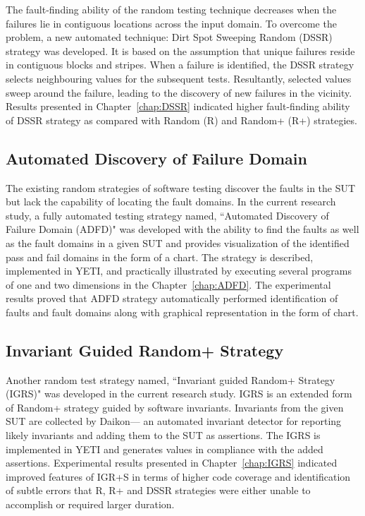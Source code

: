 The fault-finding ability of the random testing technique decreases when the failures lie in contiguous locations across the input domain. To overcome the problem, a new automated technique: Dirt Spot Sweeping Random (DSSR) strategy was developed. It is based on the assumption that unique failures reside in contiguous blocks and stripes. When a failure is identified, the DSSR strategy selects neighbouring values for the subsequent tests. Resultantly, selected values sweep around the failure, leading to the discovery of new failures in the vicinity. Results presented in Chapter~\ref{chap:DSSR} indicated higher fault-finding ability of DSSR strategy as compared with Random (R) and Random+ (R+) strategies.

\subsection{Automated Discovery of Failure Domain}
The existing random strategies of software testing discover the faults in the SUT but lack the capability of locating the fault domains. In the current research study, a fully automated testing strategy named, ``Automated Discovery of Failure Domain (ADFD)" was developed with the ability to find the faults as well as the fault domains in a given SUT and provides visualization of the identified pass and fail domains in the form of a chart. The strategy is described, implemented in YETI, and practically illustrated by executing several programs of one and two dimensions in the Chapter~\ref{chap:ADFD}. The experimental results proved that ADFD strategy automatically performed identification of faults and fault domains along with graphical representation in the form of chart.

\subsection{Invariant Guided Random+ Strategy}
Another random test strategy named, ``Invariant guided Random+ Strategy (IGRS)" was developed in the current research study. IGRS is an extended form of Random+ strategy guided by software invariants. Invariants from the given SUT are collected by Daikon--- an automated invariant detector for reporting likely invariants and adding them to the SUT as assertions. The IGRS is implemented in YETI and generates values in compliance with the added assertions. Experimental results presented in Chapter~\ref{chap:IGRS} indicated improved features of IGR+S in terms of higher code coverage and identification of subtle errors that R, R+ and DSSR strategies were either unable to accomplish or required larger duration.  

